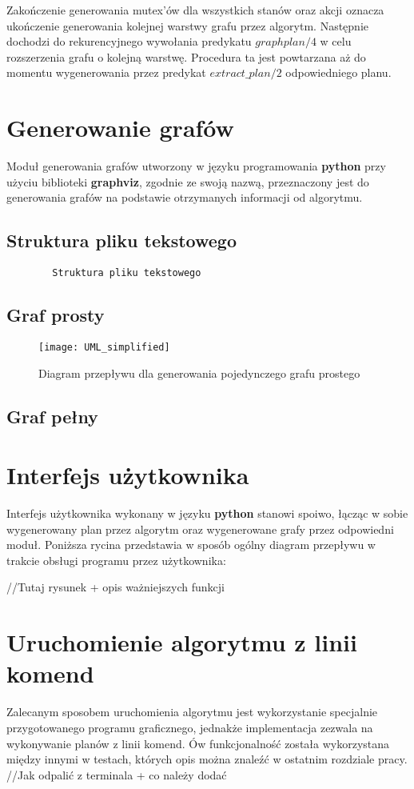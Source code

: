     Zakończenie generowania mutex'ów dla wszystkich stanów oraz akcji oznacza ukończenie generowania kolejnej warstwy grafu przez algorytm. 
    Następnie dochodzi do rekurencyjnego wywołania predykatu $graphplan/4$ w celu rozszerzenia grafu o kolejną warstwę. Procedura ta 
    jest powtarzana aż do momentu wygenerowania przez predykat $extract\_plan/2$ odpowiedniego planu.


\section{Generowanie grafów}
    Moduł generowania grafów utworzony w języku programowania \textbf{python} przy użyciu biblioteki \textbf{graphviz}, zgodnie ze swoją nazwą,
    przeznaczony jest do generowania grafów na podstawie otrzymanych informacji od algorytmu.
    \subsection{Struktura pliku tekstowego}

    \begin{lstlisting}
        Struktura pliku tekstowego
    \end{lstlisting}

    \subsection{Graf prosty}

    \begin{figure}[H]
        \texttt{[image: UML\_simplified]}
        \centering
        \caption{Diagram przepływu dla generowania pojedynczego grafu prostego}
    \end{figure}

    \subsection{Graf pełny}



\section{Interfejs użytkownika}
    Interfejs użytkownika wykonany w języku \textbf{python} stanowi spoiwo, łącząc w sobie wygenerowany plan przez algorytm oraz wygenerowane grafy przez 
    odpowiedni moduł. Poniższa rycina przedstawia w sposób ogólny diagram przepływu w trakcie obsługi programu przez użytkownika:

    //Tutaj rysunek + opis ważniejszych funkcji


\section{Uruchomienie algorytmu z linii komend}
    \label{CommandLine}
    Zalecanym sposobem uruchomienia algorytmu jest wykorzystanie specjalnie przygotowanego programu graficznego, jednakże implementacja zezwala na 
    wykonywanie planów z linii komend. Ów funkcjonalność została wykorzystana między innymi w testach, których opis można znaleźć w ostatnim rozdziale pracy.
    //Jak odpalić z terminala + co należy dodać
